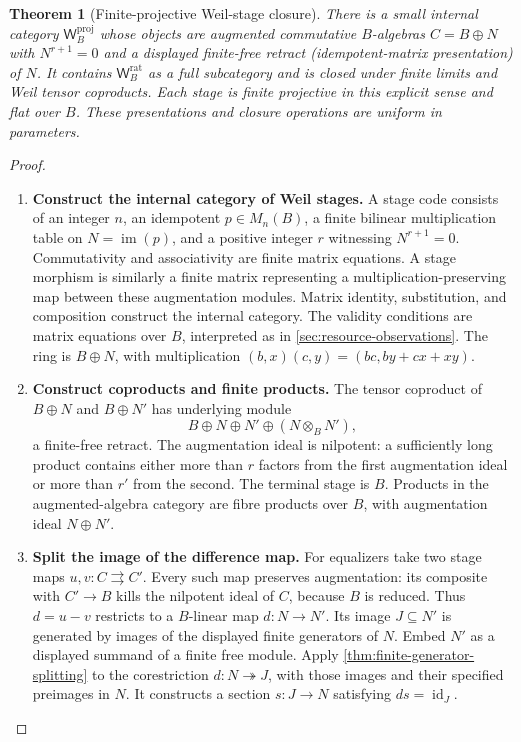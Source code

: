\documentclass[11pt,a4paper]{article}
\numberwithin{algorithm}{section}
\numberwithin{equation}{section}
\newtheorem{theorem}{Theorem}[section]
\theoremstyle{definition}
\theoremstyle{remark}
\theoremstyle{plain}
\newcommand{\id}{\operatorname{id}}
\newcommand{\Weil}{\mathsf W}
\theoremstyle{definition}
\theoremstyle{plain}
\begin{document}
\begin{theorem}[Finite-projective Weil-stage closure]
\label{prop:projective-weil}
There is a small internal category $\Weil_B^{\mathrm{proj}}$ whose
objects are augmented commutative $B$-algebras
$C=B\oplus N$ with $N^{r+1}=0$ and a displayed finite-free
retract (idempotent-matrix presentation) of $N$. It contains
$\Weil_B^{\mathrm{rat}}$ as a full subcategory and is closed
under finite limits and Weil tensor coproducts. Each stage is
finite projective in this explicit sense and flat over $B$.
These presentations and closure operations are uniform in parameters.
\end{theorem}
\begin{proof}\leavevmode
\begin{enumerate}[leftmargin=*,align=left]
\item \textbf{Construct the internal category of Weil stages.}
A stage code consists of an integer $n$, an idempotent
$p\in M_n(B)$, a finite bilinear multiplication table on
$N=\operatorname{im}(p)$, and a positive integer $r$ witnessing
$N^{r+1}=0$. Commutativity and associativity are finite
matrix equations. A stage morphism is similarly a finite
matrix representing a multiplication-preserving map between
these augmentation modules. Matrix identity, substitution, and
composition construct the internal category. The validity conditions are matrix equations over $B$, interpreted as in \cref{sec:resource-observations}. The ring is
$B\oplus N$, with multiplication
$(b,x)(c,y)=(bc,by+cx+xy)$.

\item \textbf{Construct coproducts and finite products.}
The tensor coproduct of $B\oplus N$ and $B\oplus N'$ has
underlying module
\[
 B\oplus N\oplus N'\oplus(N\otimes_BN'),
\]
a finite-free retract. The augmentation ideal is nilpotent:
a sufficiently long product contains either more than $r$
factors from the first augmentation ideal or more than $r'$
from the second. The terminal stage is $B$. Products in the
augmented-algebra category are fibre products over $B$, with
augmentation ideal $N\oplus N'$.

\item \textbf{Split the image of the difference map.}
For equalizers take two stage maps $u,v:C\rightrightarrows C'$.
Every such map preserves augmentation: its composite with
$C'\to B$ kills the nilpotent ideal of $C$, because $B$ is
reduced. Thus $d=u-v$ restricts to a $B$-linear map
$d:N\to N'$. Its image $J\subseteq N'$ is generated by
images of the displayed finite generators of $N$. Embed $N'$
as a displayed summand of a finite free module. Apply
\cref{thm:finite-generator-splitting} to the corestriction
$d:N\twoheadrightarrow J$, with those images and their
specified preimages in $N$. It constructs a section
$s:J\to N$ satisfying $ds=\id_J$.


\end{enumerate}
\end{proof}
\end{document}
